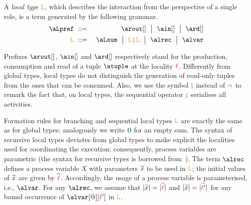 %

A {\em local type} $\texttt{\textcolor{orange}L}$, which describes the interaction from the
perspective of a single role, is a term generated by the following
grammar.
%
\begin{eqnarray*}
  \aLpref & \bnfdef &
                  \arout[]\bnfmid
                  \ain[] \bnfmid
                  \ard[] 
\\
  \aL & \bnfdef &
                  \aLsum \bnfmid
                  \aL \lseqop \aL \bnfmid
                   \alrec \bnfmid
  	        \alvar%
\end{eqnarray*}

Prefixes $\arout[]$, $\ain[]$ and $\ard[]$ respectively stand for the
production, consumption and read of a tuple $\atuple$ at the locality
${\color{red}\ell}$. Differently from global types, local types do not
distinguish the generation of read-only tuples from the ones that can
be consumed.
%
Also, we use the symbol $\lseqop$ instead of $\seqop$ to remark the fact that,
on local types, the sequential operator $\lseqop$ serialises all activities.

Formation rules for branching and sequential local types $\texttt{\textcolor{orange}L}$ are
exactly the same as for global types; analogously we write $\nil$ for
an empty sum.  The syntax of recursive local types deviates from
global types to make explicit the localities used for coordinating the
execution; consequently, process variables are parametric (the syntax
for recursive types is borrowed from~\cite{bhty10}).  The term $\alrec$
defines a process variable $X$ with parameters $\widetilde{x}$ to be used in
$\texttt{\textcolor{orange}L}$; the initial values of $\widetilde{x}$ are given by
$\widetilde{{\color{red}\ell}}$. Accordingly, the usage of a process variable is
parameterised, i.e., $\alvar$.  For any $\alrec$, we assume that
$|\widetilde{x}| = |\widetilde{{\color{red}\ell}}|$ and $|\widetilde{x}| = |\widetilde{{\color{red}\ell}'}|$ for
any bound occurrence of $\alvar[@][\alocvar']$ in $\texttt{\textcolor{orange}L}$.


